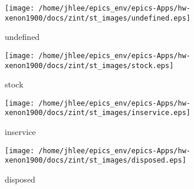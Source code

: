 \noindent
\vspace{1.4cm}
\begin{minipage}{.2\textwidth}
\begin{center}
\texttt{[image: /home/jhlee/epics\_env/epics-Apps/hw-xenon1900/docs/zint/st\_images/undefined.eps]}
\end{center}
\end{minipage}
\begin{minipage}{.7\textwidth}
undefined
\end{minipage}


\noindent
\vspace{1.4cm}
\begin{minipage}{.2\textwidth}
\begin{center}
\texttt{[image: /home/jhlee/epics\_env/epics-Apps/hw-xenon1900/docs/zint/st\_images/stock.eps]}
\end{center}
\end{minipage}
\begin{minipage}{.7\textwidth}
stock
\end{minipage}


\noindent
\vspace{1.4cm}
\begin{minipage}{.2\textwidth}
\begin{center}
\texttt{[image: /home/jhlee/epics\_env/epics-Apps/hw-xenon1900/docs/zint/st\_images/inservice.eps]}
\end{center}
\end{minipage}
\begin{minipage}{.7\textwidth}
inservice
\end{minipage}


\noindent
\vspace{1.4cm}
\begin{minipage}{.2\textwidth}
\begin{center}
\texttt{[image: /home/jhlee/epics\_env/epics-Apps/hw-xenon1900/docs/zint/st\_images/disposed.eps]}
\end{center}
\end{minipage}
\begin{minipage}{.7\textwidth}
disposed
\end{minipage}


